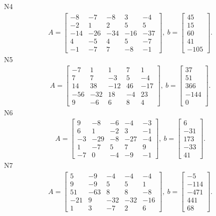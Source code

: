\documentclass[11pt]{report}
\begin{document}
N4
\begin{align*}
 A = \left[\begin{matrix}-8 & -7 & -8 & 3 & -4\\-2 & 1 & 2 & 5 & 5\\-14 & -26 & -34 & -16 & -37\\4 & -5 & 4 & 5 & -7\\-1 & -7 & 7 & -8 & -1\end{matrix}\right],
\ b = \left[\begin{matrix}45\\15\\60\\41\\-105\end{matrix}\right]. 
 \end{align*}
N5
\begin{align*}
 A = \left[\begin{matrix}-7 & 1 & 1 & 7 & 1\\7 & 7 & -3 & 5 & -4\\14 & 38 & -12 & 46 & -17\\-56 & -32 & 18 & -4 & 23\\9 & -6 & 6 & 8 & 4\end{matrix}\right],
\ b = \left[\begin{matrix}37\\51\\366\\-144\\0\end{matrix}\right]. 
 \end{align*}
N6
\begin{align*}
 A = \left[\begin{matrix}9 & -8 & -6 & -4 & -3\\6 & 1 & -2 & 3 & -1\\-3 & -29 & -8 & -27 & -4\\1 & -7 & 5 & 7 & 9\\-7 & 0 & -4 & -9 & -1\end{matrix}\right],
\ b = \left[\begin{matrix}6\\-31\\173\\-33\\41\end{matrix}\right]. 
 \end{align*}
N7
\begin{align*}
 A = \left[\begin{matrix}5 & -9 & -4 & -4 & -4\\9 & -9 & 5 & 5 & 1\\51 & -63 & 8 & 8 & -8\\-21 & 9 & -32 & -32 & -16\\1 & 3 & -7 & 2 & 6\end{matrix}\right],
\ b = \left[\begin{matrix}-5\\-114\\-471\\441\\68\end{matrix}\right]. 
 \end{align*}
\end{document}
